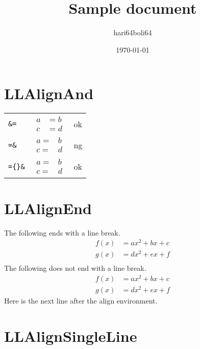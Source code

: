 \documentclass[a4paper]{article}
\newcommand{\tA}[1]{\textcolor{cA}{#1}}
\newcommand{\tD}[1]{\textcolor{cD}{#1}}
\begin{document}
\title{Sample document}
\author{hari64boli64}
\date{\today}
\maketitle

\section{LLAlignAnd}

\begin{table}[H]
	\centering
	\begin{tabular}{lll}
		\verb|&=|        &
		$\begin{aligned}
				 a & = b \\
				 c & = d
			 \end{aligned}$ &
		\tA{ok}            \\[0.3cm]
		\verb|=&|        &
		$\begin{aligned}
				 a = & b \\
				 c = & d
			 \end{aligned}$ &
		\tD{ng}            \\[0.3cm]
		\verb|={}&|      &
		$\begin{aligned}
				 a = {} & b \\
				 c = {} & d
			 \end{aligned}$ &
		\tA{ok}
	\end{tabular}
\end{table}

\section{LLAlignEnd}

The following ends with a line break.
\begin{align*}
	f(x) & = ax^2 + bx + c \\
	g(x) & = dx^2 + ex + f \\
\end{align*}
The following does not end with a line break.
\begin{align*}
	f(x) & = ax^2 + bx + c \\
	g(x) & = dx^2 + ex + f
\end{align*}
Here is the next line after the align environment.

\section{LLAlignSingleLine}
\end{document}
